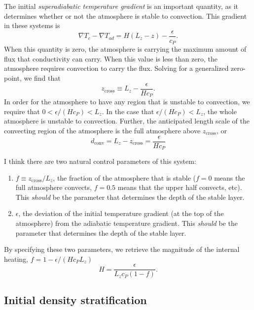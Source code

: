 \documentclass[aps, pre, onecolumn, nofootinbib, notitlepage, groupedaddress, amsfonts, amssymb, amsmath, longbibliography]{revtex4-1}
\newcommand{\grad}{\ensuremath{\nabla}}
\begin{document}
The initial \emph{superadiabatic temperature gradient} is an important quantity, as it
determines whether or not the atmosphere is stable to convection.  This gradient
in these systems is
\begin{equation}
\grad T_{c} - \grad T_{ad} = H(L_z - z) - \frac{\epsilon}{c_P}.
\end{equation}
When this quantity is zero, the atmosphere is carrying the maximum amount of flux
that conductivity can carry.  When this value is less than zero, the atmosphere
requires convection to carry the flux.  Solving for a generalized zero-point, we
find that
\begin{equation}
z_{\text{cross}} \equiv L_z - \frac{\epsilon}{H c_P}.
\end{equation}
In order for the atmosphere to have any region that is unstable to convection,
we require that $0 < \epsilon / ( H c_P ) < L_z$.  In the case that 
$\epsilon / ( H c_P ) < L_z$, the whole atmosphere is unstable to convection.
Further, the anticipated length scale of the convecting region of the atmosphere
is the full atmosphere above $z_{\text{cross}}$, or
\begin{equation}
d_{\text{conv}} = L_z - z_{\text{cross}} = \frac{\epsilon}{H c_P}
\end{equation}

I think there are two natural control parameters of this system:
\begin{enumerate}
\item $f \equiv z_{\text{cross}} / L_z$, the fraction of the atmosphere that is stable
($f = 0$ means the full atmosphere convects, $f = 0.5$ means that the upper half convects, etc).
This \emph{should} be the parameter that determines the depth of the stable layer.
\item $\epsilon$, the deviation of the initial temperature gradient (at the top of the atmosphere)
from the adiabatic temperature gradient. This \emph{should} be the parameter that determines
the depth of the stable layer.
\end{enumerate}
By specifying these two parameters, we retrieve the magnitude of the internal heating,
$ f = 1 - \epsilon / (H c_P L_z)$
\begin{equation}
H = \frac{\epsilon}{L_z c_P (1 - f)}.
\end{equation}

\subsection{Initial density stratification}
\end{document}
